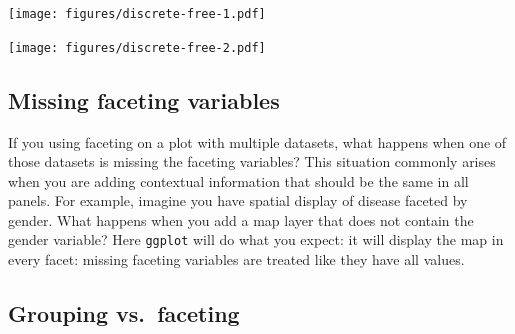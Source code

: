 \begin{Shaded}
\begin{Highlighting}[]
\StringTok{ }
  \StringTok{ }
  \StringTok{ }
\NormalTok{\})}
\StringTok{ } 

\end{Highlighting}
\end{Shaded}

\texttt{[image: figures/discrete-free-1.pdf]}

\begin{Shaded}
\begin{Highlighting}[]
\StringTok{ }\StringTok{ } \NormalTok{, }
   \NormalTok{) +}\StringTok{ }\NormalTok{(} \NormalTok{(} \NormalTok{))}
\end{Highlighting}
\end{Shaded}

\texttt{[image: figures/discrete-free-2.pdf]}

\subsection{Missing faceting
variables}\label{sub:missing-faceting-columns}

If you using faceting on a plot with multiple datasets, what happens
when one of those datasets is missing the faceting variables? This
situation commonly arises when you are adding contextual information
that should be the same in all panels. For example, imagine you have
spatial display of disease faceted by gender. What happens when you add
a map layer that does not contain the gender variable? Here
\texttt{ggplot} will do what you expect: it will display the map in
every facet: missing faceting variables are treated like they have all
values. 

\subsection{Grouping vs.~faceting}\label{sub:group-vs-facet}

